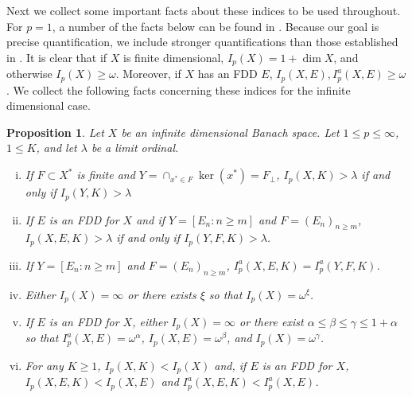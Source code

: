 \documentclass[12pt]{amsart}
\newtheorem{proposition}[theorem]{Proposition}
\theoremstyle{definition}
\begin{document}
Next we collect some important facts about these indices to be used throughout.  For $p=1$, a number of the facts below can be found in \cite{JO}. Because our goal is precise quantification, we include stronger quantifications than those established in \cite{JO}.  It is clear that if $X$ is finite dimensional, $I_p(X)=1+\dim X$, and otherwise $I_p(X)\geqslant \omega$. Moreover, if $X$ has an FDD $E$, $I_p(X,E),I_p^a(X, E)\geqslant \omega$.  We collect the following facts concerning these indices for the infinite dimensional case.   

\begin{proposition} Let $X$ be an infinite dimensional Banach space.  Let $1\leqslant p\leqslant \infty$, $1\leqslant K$, and let $\lambda$ be a limit ordinal.  \begin{enumerate}[(i)] \item If $F\subset X^*$ is finite and $Y=\cap_{x^*\in F}\ker(x^*)=F_\perp$, $I_p(X,K)>\lambda$ if and only if $I_p(Y,K)>\lambda$ \item If $E$ is an FDD for $X$ and if $Y=[E_n:n\geqslant m]$ and $F=(E_n)_{n\geqslant m}$, $I_p(X, E, K)>\lambda$ if and only if $I_p(Y,F,K)>\lambda$. \item If $Y=[E_n:n\geqslant m]$ and $F=(E_n)_{n\geqslant m}$, $I_p^a(X,E,K)=I^a_p(Y,F,K)$.  \item Either $I_p(X)=\infty$ or there exists $\xi$ so that $I_p(X)=\omega^\xi$.  \item If $E$ is an FDD for $X$, either $I_p(X)=\infty$ or there exist $\alpha\leqslant \beta\leqslant \gamma\leqslant 1+\alpha$ so that $I_p^a(X, E)=\omega^\alpha$, $I_p(X,E)=\omega^\beta$, and $I_p(X)=\omega^\gamma$.  \item For any $K\geqslant 1$, $I_p(X, K)<I_p(X)$ and, if $E$ is an FDD for $X$, $I_p(X, E, K)<I_p(X,E)$ and $I^a_p(X,E,K)<I_p^a(X,E)$.   \end{enumerate}

\label{index facts}


\end{proposition}
\end{document}

